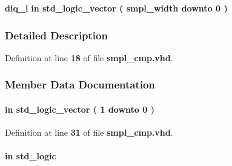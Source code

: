 \begin{DoxyCompactItemize}
\item 
{\bf diq\+\_\+l}  {\bfseries {\bfseries \textcolor{keywordflow}{in}\textcolor{vhdlchar}{ }}} {\bfseries \textcolor{comment}{std\+\_\+logic\+\_\+vector}\textcolor{vhdlchar}{ }\textcolor{vhdlchar}{(}\textcolor{vhdlchar}{ }\textcolor{vhdlchar}{ }\textcolor{vhdlchar}{ }\textcolor{vhdlchar}{ }{\bfseries {\bf smpl\+\_\+width}} \textcolor{vhdlchar}{ }\textcolor{keywordflow}{downto}\textcolor{vhdlchar}{ }\textcolor{vhdlchar}{ } \textcolor{vhdldigit}{0} \textcolor{vhdlchar}{ }\textcolor{vhdlchar}{)}\textcolor{vhdlchar}{ }} 
\end{DoxyCompactItemize}


\subsubsection{Detailed Description}


Definition at line {\bf 18} of file {\bf smpl\+\_\+cmp.\+vhd}.



\subsubsection{Member Data Documentation}
\paragraph[{ch\+\_\+en}]{ {\bfseries \textcolor{keywordflow}{in}\textcolor{vhdlchar}{ }} {\bfseries \textcolor{comment}{std\+\_\+logic\+\_\+vector}\textcolor{vhdlchar}{ }\textcolor{vhdlchar}{(}\textcolor{vhdlchar}{ }\textcolor{vhdlchar}{ } \textcolor{vhdldigit}{1} \textcolor{vhdlchar}{ }\textcolor{keywordflow}{downto}\textcolor{vhdlchar}{ }\textcolor{vhdlchar}{ } \textcolor{vhdldigit}{0} \textcolor{vhdlchar}{ }\textcolor{vhdlchar}{)}\textcolor{vhdlchar}{ }} \hspace{0.3cm}{\ttfamily [Port]}}\label{classsmpl__cmp_a6494f316f504075c4ccf47146756d576}


Definition at line {\bf 31} of file {\bf smpl\+\_\+cmp.\+vhd}.

\paragraph[{clk}]{ {\bfseries \textcolor{keywordflow}{in}\textcolor{vhdlchar}{ }} {\bfseries \textcolor{comment}{std\+\_\+logic}\textcolor{vhdlchar}{ }} \hspace{0.3cm}{\ttfamily [Port]}}\label{classsmpl__cmp_a4a4609c199d30b3adebbeb3a01276ec5}


